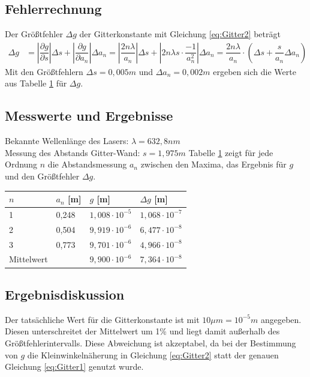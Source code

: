 \documentclass{scrartcl}
\begin{document}
\subsection{Fehlerrechnung}
Der Größtfehler $\Delta g$ der Gitterkonstante mit Gleichung \ref{eq:Gitter2} beträgt
\begin{align*}
\Delta g & = \left| \dfrac{\partial g}{\partial s} \right| \Delta s + \left| \dfrac{\partial g}{\partial a_{n}} \right| \Delta a_{n} = \left| \dfrac{2n \lambda}{a_{n}} \right| \Delta s + \left| 2n \lambda s \cdot \dfrac{-1}{a_{n}^{2}} \right| \Delta a_{n} = \dfrac{2n \lambda}{a_{n}} \cdot \left( \Delta s + \dfrac{s}{a_{n}} \Delta a_{n} \right)
\end{align*}
Mit den Größtfehlern $\Delta s = 0,005m$ und $\Delta a_{n} = 0,002m$ ergeben sich  die Werte aus Tabelle \ref{tab:Gitter} für $\Delta g$.
\subsection{Messwerte und Ergebnisse}
Bekannte Wellenlänge des Lasers: $\lambda = 632,8nm$ \\
Messung des Abstands Gitter-Wand: $s = 1,975m$
Tabelle \ref{tab:Gitter} zeigt für jede Ordnung $n$ die Abstandsmessung $a_{n}$ zwischen den Maxima, das Ergebnis für $g$ und den Größtfehler $\Delta g$.
\begin{table}[H]
\begin{center}
\begin{tabular}{l|l|l|l}
$n$    & $a_{n}$ {[}m{]} & $g$ {[}m{]} & $\Delta g$ {[}m{]}\\
\hline
1          & 0,248       & $1,008 \cdot 10^{-5}$ & $1,068 \cdot 10^{-7}$ \\
2          & 0,504       & $9,919 \cdot 10^{-6}$ & $6,477 \cdot 10^{-8}$ \\
3          & 0,773       & $9,701 \cdot 10^{-6}$ & $4,966 \cdot 10^{-8}$ \\
\hline
Mittelwert &             & $9,900 \cdot 10^{-6}$ & $7,364 \cdot 10^{-8}$
\end{tabular}
\end{center}
\label{tab:Gitter}
\end{table}

\subsection{Ergebnisdiskussion}
Der tatsächliche Wert für die Gitterkonstante ist mit $10 \mu m = 10^{-5} m$ angegeben. Diesen unterschreitet der Mittelwert um 1\% und liegt damit außerhalb des Größtfehlerintervalls. Diese Abweichung ist akzeptabel, da bei der Bestimmung von $g$ die Kleinwinkelnäherung in Gleichung \ref{eq:Gitter2} statt der genauen Gleichung \ref{eq:Gitter1} genutzt wurde.
\end{document}
